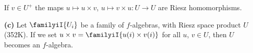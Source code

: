 \medskip
     
 If $v\in U^+$ the
maps $u\mapsto u\times v$, $u\mapsto v\times u:U\to U$ are Riesz
homomorphisms.
     
\medskip
     
{\bf (c)} Let $\familyiI{U_i}$ be a family of $f$-algebras, with Riesz
space product $U$ (352K).   If we set
$u\times v=\familyiI{u(i)\times v(i)}$ for all $u$, $v\in U$, then $U$
becomes an $f$-algebra.
     
